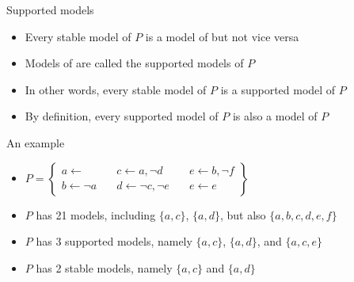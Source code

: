 \begin{frame}{Supported models}
  \bigskip
  \begin{itemize}
  \item<1-> Every stable model of $P$ is a model of \pause[2]
    but not vice versa
    \smallskip
  \item<3-> Models of  are called the \alert{supported models} of $P$
    \bigskip
  \item<4-> In other words, every stable model of $P$ is a supported model of $P$
    \smallskip
  \item<4-> By definition, every supported model of $P$ is also a model of $P$
\end{itemize}
\end{frame}
\begin{frame}{An example}
  \bigskip
  \begin{itemize}
  \item<1-> []
    \par\bigskip
    \(
    P
    =
    \left\{
      \begin{array}{lll}
        a \leftarrow                \quad &
        c \leftarrow a, \neg d      \quad &
        e \leftarrow b, \neg f
        \\
        b \leftarrow \neg a         \quad &
        d \leftarrow \neg c, \neg e \quad &
        e \leftarrow e
      \end{array}
    \right\}
    \)
    \bigskip
    \bigskip
  \item<2-> $P$ has 21           models, including $\{a,c\}$,    $\{a,d\}$, but also $\{a,b,c,d,e,f\}$
    \smallskip
  \item<3-> $P$ has  3 supported models, namely    $\{a,c\}$,    $\{a,d\}$, and $\{a,c,e\}$
    \smallskip
  \item<4-> $P$ has  2 stable    models, namely    $\{a,c\}$ and $\{a,d\}$
  \end{itemize}
\end{frame}
%
